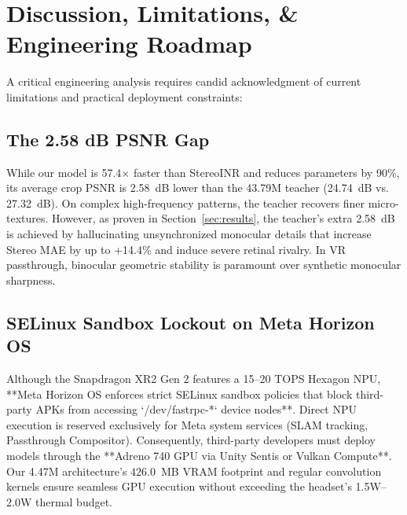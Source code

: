 \documentclass[conference]{IEEEtran}
\begin{document}
\section{Discussion, Limitations, \& Engineering Roadmap}
\label{sec:discussion}
A critical engineering analysis requires candid acknowledgment of current limitations and practical deployment constraints:

\subsection{The 2.58 dB PSNR Gap}
While our model is 57.4$\times$ faster than StereoINR and reduces parameters by 90\%, its average crop PSNR is 2.58~dB lower than the 43.79M teacher (24.74~dB vs. 27.32~dB). On complex high-frequency patterns, the teacher recovers finer micro-textures. However, as proven in Section~\ref{sec:results}, the teacher's extra 2.58~dB is achieved by hallucinating unsynchronized monocular details that increase Stereo MAE by up to +14.4\% and induce severe retinal rivalry. In VR passthrough, binocular geometric stability is paramount over synthetic monocular sharpness.

\subsection{SELinux Sandbox Lockout on Meta Horizon OS}
Although the Snapdragon XR2 Gen 2 features a 15--20 TOPS Hexagon NPU, **Meta Horizon OS enforces strict SELinux sandbox policies that block third-party APKs from accessing `/dev/fastrpc-*` device nodes**. Direct NPU execution is reserved exclusively for Meta system services (SLAM tracking, Passthrough Compositor). Consequently, third-party developers must deploy models through the **Adreno 740 GPU via Unity Sentis or Vulkan Compute**. Our 4.47M architecture's $426.0$~MB VRAM footprint and regular convolution kernels ensure seamless GPU execution without exceeding the headset's 1.5W--2.0W thermal budget.
\end{document}
